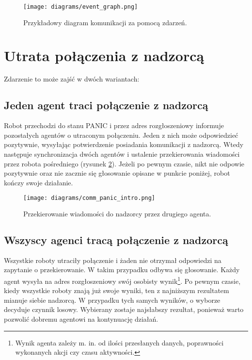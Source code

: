 \begin{figure}[!ht]
    \centering
        \texttt{[image: diagrams/event\_graph.png]}
    \caption{Przykładowy diagram komunikacji za pomocą zdarzeń.\label{fig:event_graph}}
\end{figure}

\section{Utrata połączenia z nadzorcą}
\label{sec:utrata_polaczenia}

Zdarzenie to może zajść w dwóch wariantach:

\subsection{Jeden agent traci połączenie z nadzorcą}

Robot przechodzi do stanu PANIC i przez adres rozgłoszeniowy informuje pozostałych agentów o utraconym połączeniu. Jeden z nich może odpowiedzieć pozytywnie, wysyłając potwierdzenie posiadania komunikacji z nadzorcą. Wtedy następuje synchronizacja dwóch agentów i ustalenie przekierowania wiadomości przez robota pośredniego (rysunek \ref{fig:comm_panic_intro}). Jeżeli po pewnym czasie, nikt nie odpowie pozytywnie oraz nie zacznie się głosowanie opisane w punkcie poniżej, robot kończy swoje działanie.

\begin{figure}[!ht]
    \centering
        \texttt{[image: diagrams/comm\_panic\_intro.png]}
    \caption{Przekierowanie wiadomości do nadzorcy przez drugiego agenta.\label{fig:comm_panic_intro}}
\end{figure}

\subsection{Wszyscy agenci tracą połączenie z nadzorcą}

Wszystkie roboty utraciły połączenie i żaden nie otrzymał odpowiedzi na zapytanie o przekierowanie. W takim przypadku odbywa się głosowanie. Każdy agent wysyła na adres rozgłoszeniowy swój osobisty wynik\footnote{Wynik agenta zależy m. in. od ilości przesłanych danych, poprawności wykonanych akcji czy czasu aktywności.}. Po pewnym czasie, kiedy wszystkie roboty znają już swoje wyniki, ten z najniższym rezultatem mianuje siebie nadzorcą. W przypadku tych samych wyników, o wyborze decyduje czynnik losowy. Wybierany zostaje najsłabszy rezultat, ponieważ warto pozwolić dobremu agentowi na kontynuację działań.

